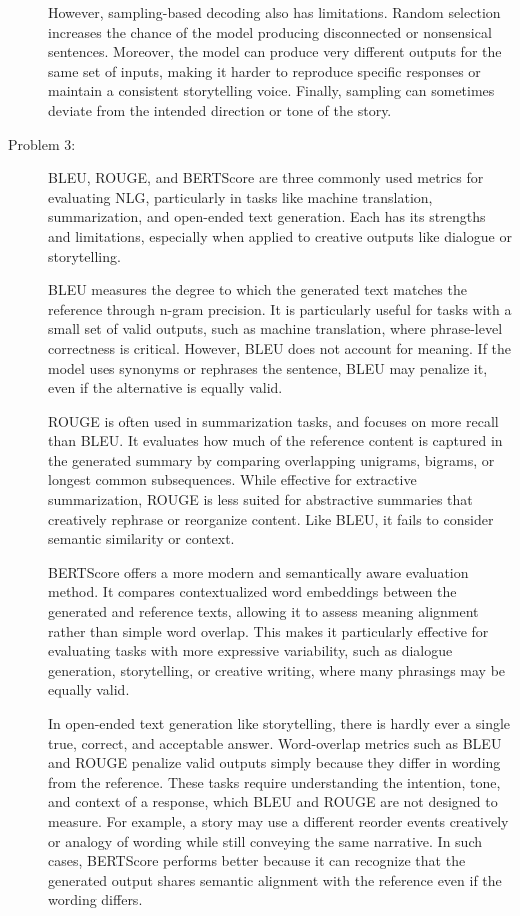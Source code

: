 \documentclass[10pt]{article}
\begin{document}
\begin{description}
However, sampling-based decoding also has limitations. Random selection increases the chance of the model producing disconnected 
or nonsensical sentences. Moreover, the model can produce very different outputs for the same set of inputs, 
making it harder to reproduce specific responses or maintain a consistent storytelling voice.
Finally, sampling can sometimes deviate from the intended direction or tone of the story.

\item[Problem 3:] \hfill %

BLEU, ROUGE, and BERTScore are three commonly used metrics for evaluating NLG, particularly in tasks like machine translation, summarization, 
and open-ended text generation. Each has its strengths and limitations, especially when applied to creative outputs like dialogue or storytelling.

BLEU measures the degree to which the generated text matches the reference through n-gram precision. 
It is particularly useful for tasks with a small set of valid outputs, such as machine translation, where phrase-level correctness is critical. 
However, BLEU does not account for meaning. If the model uses synonyms or rephrases the sentence, BLEU may penalize it, even if the alternative is equally valid.

ROUGE is often used in summarization tasks, and focuses on more recall than BLEU. It evaluates how much of the reference content is captured in the generated 
summary by comparing overlapping unigrams, bigrams, or longest common subsequences. While effective for extractive summarization, 
ROUGE is less suited for abstractive summaries that creatively rephrase or reorganize content. Like BLEU, it fails to consider semantic similarity or context.

BERTScore offers a more modern and semantically aware evaluation method. It compares contextualized word embeddings between the generated and reference texts, 
allowing it to assess meaning alignment rather than simple word overlap. This makes it particularly effective for evaluating tasks with more expressive variability, 
such as dialogue generation, storytelling, or creative writing, where many phrasings may be equally valid.

In open-ended text generation like storytelling, there is hardly ever a single true, correct, and acceptable answer. 
Word-overlap metrics such as BLEU and ROUGE penalize valid outputs simply because they differ in wording from the reference. 
These tasks require understanding the intention, tone, and context of a response, which BLEU and ROUGE are not designed to measure. 
For example, a story may use a different reorder events creatively or analogy of wording while still conveying the same narrative. 
In such cases, BERTScore performs better because it can recognize that the generated output shares semantic alignment with the reference even if the wording differs.


\end{description}
\end{document}

